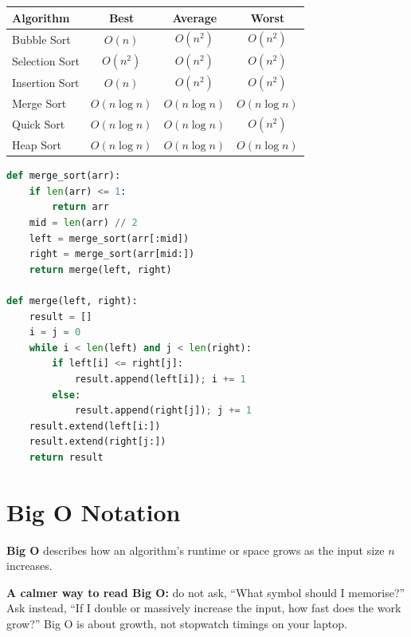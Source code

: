 \documentclass[12pt, a4paper, oneside]{book}
\begin{document}
\begin{center}
\begin{tabular}{l c c c}
\toprule
\textbf{Algorithm} & \textbf{Best} & \textbf{Average} & \textbf{Worst} \\
\midrule
Bubble Sort & $O(n)$ & $O(n^2)$ & $O(n^2)$ \\
Selection Sort & $O(n^2)$ & $O(n^2)$ & $O(n^2)$ \\
Insertion Sort & $O(n)$ & $O(n^2)$ & $O(n^2)$ \\
Merge Sort & $O(n \log n)$ & $O(n \log n)$ & $O(n \log n)$ \\
Quick Sort & $O(n \log n)$ & $O(n \log n)$ & $O(n^2)$ \\
Heap Sort & $O(n \log n)$ & $O(n \log n)$ & $O(n \log n)$ \\
\bottomrule
\end{tabular}
\end{center}

\begin{lstlisting}[language=Python, caption={Merge sort implementation}]
def merge_sort(arr):
    if len(arr) <= 1:
        return arr
    mid = len(arr) // 2
    left = merge_sort(arr[:mid])
    right = merge_sort(arr[mid:])
    return merge(left, right)

def merge(left, right):
    result = []
    i = j = 0
    while i < len(left) and j < len(right):
        if left[i] <= right[j]:
            result.append(left[i]); i += 1
        else:
            result.append(right[j]); j += 1
    result.extend(left[i:])
    result.extend(right[j:])
    return result
\end{lstlisting}

\section{Big O Notation}

\textbf{Big O} describes how an algorithm's runtime or space grows as the input size $n$ increases.

\begin{notebox}
\textbf{A calmer way to read Big O:} do not ask, ``What symbol should I memorise?'' Ask instead, ``If I double or massively increase the input, how fast does the work grow?'' Big O is about growth, not stopwatch timings on your laptop.
\end{notebox}
\end{document}
